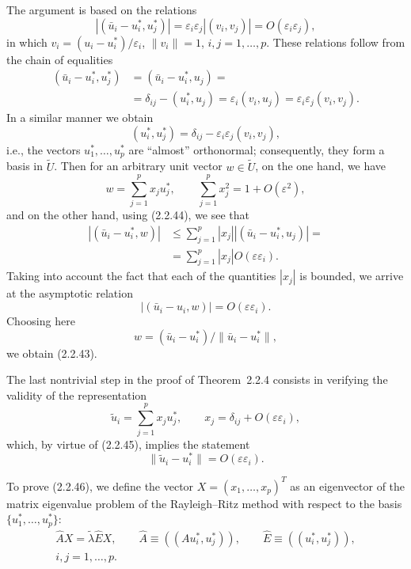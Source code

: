 \documentclass[11pt,oneside]{book}
\begin{document}
The argument is based on the relations
\[
|(\bar{u}_i - u_i^*, u_j^*)| = \varepsilon_i \varepsilon_j |(v_i, v_j)| = O(\varepsilon_i \varepsilon_j), \tag{2.2.44}
\]
in which $v_i = (u_i - u_i^*) / \varepsilon_i$, $\|v_i\| = 1$, $i, j = 1, \ldots, p$. These relations follow from the chain of equalities
\begin{align*}
(\bar{u}_i - u_i^*, u_j^*) &= (\bar{u}_i - u_i^*, u_j) = \\
&= \delta_{ij} - (u_i^*, u_j) = \varepsilon_i (v_i, u_j) = \varepsilon_i \varepsilon_j (v_i, v_j).
\end{align*}
In a similar manner we obtain
\[
(u_i^*, u_j^*) = \delta_{ij} - \varepsilon_i \varepsilon_j (v_i, v_j), \tag{2.2.45}
\]
i.e., the vectors $u_1^*, \ldots, u_p^*$ are ``almost'' orthonormal; consequently, they form a basis in $\widetilde{U}$. Then for an arbitrary unit vector $w \in \widetilde{U}$, on the one hand, we have
\[
w = \sum_{j=1}^p x_j u_j^*, \qquad \sum_{j=1}^p x_j^2 = 1 + O(\varepsilon^2),
\]
and on the other hand, using (2.2.44), we see that
\begin{align*}
|(\bar{u}_i - u_i^*, w)| &\leqslant \sum_{j=1}^p |x_j| |(\bar{u}_i - u_i^*, u_j)| = %
\\
&= \sum_{j=1}^p |x_j| O(\varepsilon \varepsilon_i).
\end{align*}
Taking into account the fact that each of the quantities $|x_j|$ is bounded, we arrive at the asymptotic relation
\[
|(\bar{u}_i - u_i, w)| = O(\varepsilon \varepsilon_i). %
\]
Choosing here
\[
w = (\bar{u}_i - u_i^*) / \|\bar{u}_i - u_i^*\|,
\]
we obtain (2.2.43).

The last nontrivial step in the proof of Theorem~2.2.4 consists in verifying the validity of the representation
\[
\tilde{u}_i = \sum_{j=1}^p x_j u_j^*, \qquad x_j = \delta_{ij} + O(\varepsilon \varepsilon_i), \tag{2.2.46}
\]
which, by virtue of (2.2.45), implies the statement
\[
\|\tilde{u}_i - u_i^*\| = O(\varepsilon \varepsilon_i). \tag{2.2.47}
\]

To prove (2.2.46), we define the vector $X = (x_1, \ldots, x_p)^T$ as an eigenvector of the matrix eigenvalue problem of the Rayleigh--Ritz method with respect to the basis $\{u_1^*, \ldots, u_p^*\}$:
\begin{gather*}
\widehat{A} X = \tilde{\lambda} \widehat{E} X, \qquad \widehat{A} \equiv ((Au_i^*, u_j^*)), \qquad \widehat{E} \equiv ((u_i^*, u_j^*)), \tag{2.2.48} \\
i, j = 1, \ldots, p.
\end{gather*}
\end{document}
